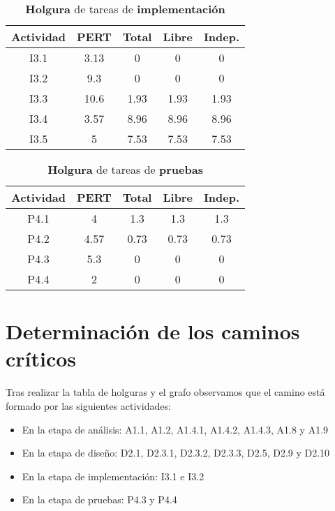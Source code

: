 \documentclass[11pt,a4paper,spanish,twoside]{report}
\begin{document}
\begin{table}[!h]
\centering
  \begin{tabular}{|c||c||c|c|c|}
    \hline
     \textbf{Actividad} & \textbf{PERT} & \textbf{Total} & \textbf{Libre}
    & \textbf{Indep.}\\
    \hline \hline
    I3.1 & 3.13 & 0 & 0 & 0\\
    \hline
    I3.2 & 9.3 & 0 & 0 & 0\\
    \hline
    I3.3 & 10.6 & 1.93 & 1.93 & 1.93\\
    \hline
    I3.4 & 3.57 & 8.96 & 8.96 & 8.96\\
    \hline
    I3.5 & 5 & 7.53 & 7.53 & 7.53\\
    \hline
  \end{tabular}
  \caption{\textbf{Holgura} de tareas de \textbf{implementación}}
  \label{Tab:HOLimp}
\end{table}

\begin{table}[!h]
\centering
  \begin{tabular}{|c||c||c|c|c|}
    \hline
     \textbf{Actividad} & \textbf{PERT} & \textbf{Total} & \textbf{Libre}
    & \textbf{Indep.}\\
    \hline \hline
    P4.1 & 4 & 1.3 & 1.3 & 1.3\\
    \hline
    P4.2 & 4.57 & 0.73 & 0.73 & 0.73\\
    \hline
    P4.3 & 5.3 & 0 & 0 & 0\\
    \hline
    P4.4 & 2 & 0 & 0 & 0\\
    \hline
  \end{tabular}
  \caption{\textbf{Holgura} de tareas de \textbf{pruebas}}
  \label{Tab:HOLpru}
\end{table}

\section{Determinación de los caminos críticos}
Tras realizar la tabla de holguras y el grafo observamos que el camino está
formado por las siguientes actividades:
\begin{itemize}
\item En la etapa de análisis: A1.1, A1.2, A1.4.1, A1.4.2, A1.4.3, A1.8 y A1.9 
\item En la etapa de diseño: D2.1, D2.3.1, D2.3.2, D2.3.3, D2.5, D2.9 y D2.10 
\item En la etapa de implementación: I3.1 e I3.2
\item En la etapa de pruebas: P4.3 y P4.4
\end{itemize}
\end{document}
